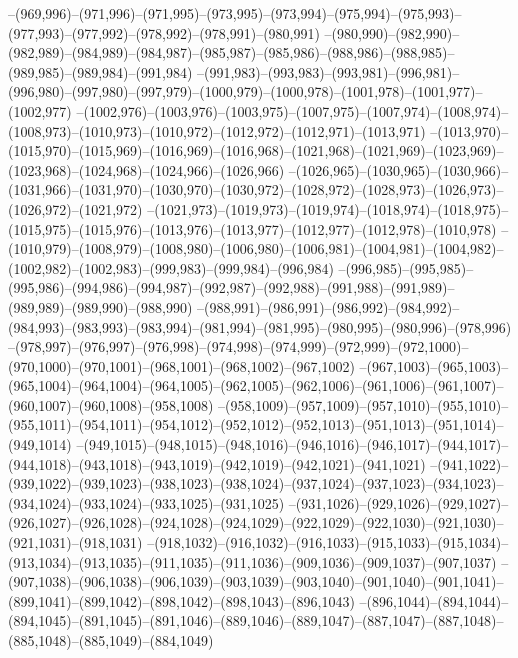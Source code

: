 --(969,996)--(971,996)--(971,995)--(973,995)--(973,994)--(975,994)--(975,993)--(977,993)--(977,992)--(978,992)--(978,991)--(980,991)
--(980,990)--(982,990)--(982,989)--(984,989)--(984,987)--(985,987)--(985,986)--(988,986)--(988,985)--(989,985)--(989,984)--(991,984)
--(991,983)--(993,983)--(993,981)--(996,981)--(996,980)--(997,980)--(997,979)--(1000,979)--(1000,978)--(1001,978)--(1001,977)--(1002,977)
--(1002,976)--(1003,976)--(1003,975)--(1007,975)--(1007,974)--(1008,974)--(1008,973)--(1010,973)--(1010,972)--(1012,972)--(1012,971)--(1013,971)
--(1013,970)--(1015,970)--(1015,969)--(1016,969)--(1016,968)--(1021,968)--(1021,969)--(1023,969)--(1023,968)--(1024,968)--(1024,966)--(1026,966)
--(1026,965)--(1030,965)--(1030,966)--(1031,966)--(1031,970)--(1030,970)--(1030,972)--(1028,972)--(1028,973)--(1026,973)--(1026,972)--(1021,972)
--(1021,973)--(1019,973)--(1019,974)--(1018,974)--(1018,975)--(1015,975)--(1015,976)--(1013,976)--(1013,977)--(1012,977)--(1012,978)--(1010,978)
--(1010,979)--(1008,979)--(1008,980)--(1006,980)--(1006,981)--(1004,981)--(1004,982)--(1002,982)--(1002,983)--(999,983)--(999,984)--(996,984)
--(996,985)--(995,985)--(995,986)--(994,986)--(994,987)--(992,987)--(992,988)--(991,988)--(991,989)--(989,989)--(989,990)--(988,990)
--(988,991)--(986,991)--(986,992)--(984,992)--(984,993)--(983,993)--(983,994)--(981,994)--(981,995)--(980,995)--(980,996)--(978,996)
--(978,997)--(976,997)--(976,998)--(974,998)--(974,999)--(972,999)--(972,1000)--(970,1000)--(970,1001)--(968,1001)--(968,1002)--(967,1002)
--(967,1003)--(965,1003)--(965,1004)--(964,1004)--(964,1005)--(962,1005)--(962,1006)--(961,1006)--(961,1007)--(960,1007)--(960,1008)--(958,1008)
--(958,1009)--(957,1009)--(957,1010)--(955,1010)--(955,1011)--(954,1011)--(954,1012)--(952,1012)--(952,1013)--(951,1013)--(951,1014)--(949,1014)
--(949,1015)--(948,1015)--(948,1016)--(946,1016)--(946,1017)--(944,1017)--(944,1018)--(943,1018)--(943,1019)--(942,1019)--(942,1021)--(941,1021)
--(941,1022)--(939,1022)--(939,1023)--(938,1023)--(938,1024)--(937,1024)--(937,1023)--(934,1023)--(934,1024)--(933,1024)--(933,1025)--(931,1025)
--(931,1026)--(929,1026)--(929,1027)--(926,1027)--(926,1028)--(924,1028)--(924,1029)--(922,1029)--(922,1030)--(921,1030)--(921,1031)--(918,1031)
--(918,1032)--(916,1032)--(916,1033)--(915,1033)--(915,1034)--(913,1034)--(913,1035)--(911,1035)--(911,1036)--(909,1036)--(909,1037)--(907,1037)
--(907,1038)--(906,1038)--(906,1039)--(903,1039)--(903,1040)--(901,1040)--(901,1041)--(899,1041)--(899,1042)--(898,1042)--(898,1043)--(896,1043)
--(896,1044)--(894,1044)--(894,1045)--(891,1045)--(891,1046)--(889,1046)--(889,1047)--(887,1047)--(887,1048)--(885,1048)--(885,1049)--(884,1049)
